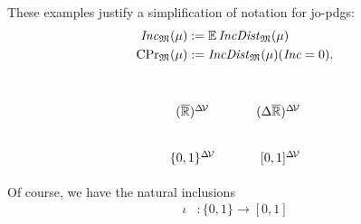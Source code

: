 \documentclass{article}
\newcommand\IncD{\mathit{IncDist}}
\begin{document}
These examples justify a simplification of notation for jo-pdgs:
\begin{align*}
    \Inc_{\mathfrak M}(\mu) &:= \Ex\IncD_{\mathfrak M}(\mu) \\ 
    \mathrm{CPr}_{\mathfrak M}(\mu) &:= \IncD_{\mathfrak M}(\mu)(\Inc = 0).
\end{align*}

% 
% 


\clearpage
\section{}

\[
    \begin{tikzcd}
        (\overline{\mathbb R})^{\Delta\!\V}
            & (\Delta \overline{\mathbb R})^{\Delta \!\V}
        \\  \{0,1\}^{\Delta\!\V}
            &\ [0,1]^{\Delta\!\V}
    \end{tikzcd}
\]

Of course, we have the natural inclusions 
\begin{align*}
    \iota &: \{0, 1\} \to [0,1] \\
\end{align*}


\appendix
\end{document}
